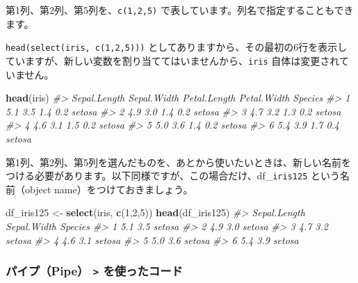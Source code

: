 \documentclass[
  xelatex, ja=standard]{bxjsbook}
\newenvironment{Shaded}{\begin{snugshade}}{\end{snugshade}}
\newcommand{\CommentTok}[1]{\textcolor[rgb]{0.56,0.35,0.01}{\textit{#1}}}
\newcommand{\DecValTok}[1]{\textcolor[rgb]{0.00,0.00,0.81}{#1}}
\newcommand{\FunctionTok}[1]{\textcolor[rgb]{0.13,0.29,0.53}{\textbf{#1}}}
\newcommand{\NormalTok}[1]{#1}
\newcommand{\OtherTok}[1]{\textcolor[rgb]{0.56,0.35,0.01}{#1}}
\theoremstyle{definition}
\theoremstyle{definition}
\theoremstyle{definition}
\theoremstyle{definition}
\theoremstyle{remark}
\begin{document}
第1列、第2列、第5列を、\texttt{c(1,2,5)} で表しています。列名で指定することもできます。

\texttt{head(select(iris,\ c(1,2,5)))} としてありますから、その最初の6行を表示していますが、新しい変数を割り当ててはいませんから、\texttt{iris} 自体は変更されていません。

\begin{Shaded}
\begin{Highlighting}[]
\FunctionTok{head}\NormalTok{(iris)}
\CommentTok{\#\textgreater{}   Sepal.Length Sepal.Width Petal.Length Petal.Width Species}
\CommentTok{\#\textgreater{} 1          5.1         3.5          1.4         0.2  setosa}
\CommentTok{\#\textgreater{} 2          4.9         3.0          1.4         0.2  setosa}
\CommentTok{\#\textgreater{} 3          4.7         3.2          1.3         0.2  setosa}
\CommentTok{\#\textgreater{} 4          4.6         3.1          1.5         0.2  setosa}
\CommentTok{\#\textgreater{} 5          5.0         3.6          1.4         0.2  setosa}
\CommentTok{\#\textgreater{} 6          5.4         3.9          1.7         0.4  setosa}
\end{Highlighting}
\end{Shaded}

第1列、第2列、第5列を選んだものを、あとから使いたいときは、新しい名前をつける必要があります。以下同様ですが、この場合だけ、df\_\texttt{iris125} という名前（object name）をつけておきましょう。

\begin{Shaded}
\begin{Highlighting}[]
\NormalTok{df\_iris125 }\OtherTok{\textless{}{-}} \FunctionTok{select}\NormalTok{(iris, }\FunctionTok{c}\NormalTok{(}\DecValTok{1}\NormalTok{,}\DecValTok{2}\NormalTok{,}\DecValTok{5}\NormalTok{))}
\FunctionTok{head}\NormalTok{(df\_iris125)}
\CommentTok{\#\textgreater{}   Sepal.Length Sepal.Width Species}
\CommentTok{\#\textgreater{} 1          5.1         3.5  setosa}
\CommentTok{\#\textgreater{} 2          4.9         3.0  setosa}
\CommentTok{\#\textgreater{} 3          4.7         3.2  setosa}
\CommentTok{\#\textgreater{} 4          4.6         3.1  setosa}
\CommentTok{\#\textgreater{} 5          5.0         3.6  setosa}
\CommentTok{\#\textgreater{} 6          5.4         3.9  setosa}
\end{Highlighting}
\end{Shaded}

\hypertarget{ux30d1ux30a4ux30d7pipe-ux3092ux4f7fux3063ux305fux30b3ux30fcux30c9}{%
\subsubsection{\texorpdfstring{パイプ（Pipe） \texttt{\textbar{}\textgreater{}} を使ったコード}{パイプ（Pipe） \textbar\textgreater{} を使ったコード}}\label{ux30d1ux30a4ux30d7pipe-ux3092ux4f7fux3063ux305fux30b3ux30fcux30c9}}
\end{document}
